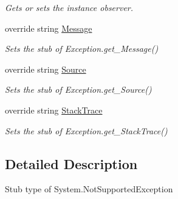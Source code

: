 \begin{DoxyCompactItemize}
\begin{DoxyCompactList}\small\item\em Gets or sets the instance observer.\end{DoxyCompactList}\item 
override string \hyperlink{class_system_1_1_fakes_1_1_stub_not_supported_exception_a10e70da4ee636db3be01bc7520f88da5}{Message}
\begin{DoxyCompactList}\small\item\em Sets the stub of Exception.\-get\-\_\-\-Message()\end{DoxyCompactList}\item 
override string \hyperlink{class_system_1_1_fakes_1_1_stub_not_supported_exception_acc44c9e744891a4cbdc430c839f58744}{Source}
\begin{DoxyCompactList}\small\item\em Sets the stub of Exception.\-get\-\_\-\-Source()\end{DoxyCompactList}\item 
override string \hyperlink{class_system_1_1_fakes_1_1_stub_not_supported_exception_ac2cfe0927b03f24b2678f4184dd5958f}{Stack\-Trace}
\begin{DoxyCompactList}\small\item\em Sets the stub of Exception.\-get\-\_\-\-Stack\-Trace()\end{DoxyCompactList}\end{DoxyCompactItemize}


\subsection{Detailed Description}
Stub type of System.\-Not\-Supported\-Exception



